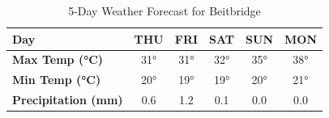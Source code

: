 
\begin{table}[h!]
\centering
\renewcommand{\arraystretch}{1.5}
\begin{tabular}{|l|c|c|c|c|c|}
\hline
\textbf{Day} & THU & FRI & SAT & SUN & MON \\ \hline
\textbf{Max Temp (°C)} & 31° & 31° & 32° & 35° & 38° \\ \hline
\textbf{Min Temp (°C)} & 20° & 19° & 19° & 20° & 21° \\ \hline
\textbf{Precipitation (mm)} & 0.6 & 1.2 & 0.1 & 0.0 & 0.0 \\ \hline
\end{tabular}
\caption{5-Day Weather Forecast for Beitbridge}
\label{tab:beitbridge-forecast}
\end{table}
